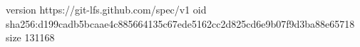 version https://git-lfs.github.com/spec/v1
oid sha256:d199cadb5bcaae4c885664135c67ede5162cc2d825cd6e9b07f9d3ba88e65718
size 131168
